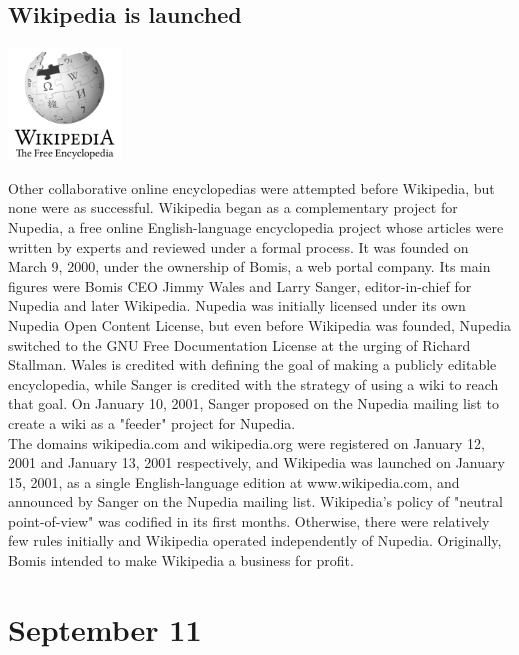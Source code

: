 \documentclass[11pt]{report}
\begin{document}
\subsection{Wikipedia is launched}
\vspace{2mm}\begin{center}\includegraphics[width=3cm]{./img/wikipedia.png}\end{center}
Other collaborative online encyclopedias were attempted before Wikipedia, but none were as successful. Wikipedia began as a complementary project for Nupedia, a free online English-language encyclopedia project whose articles were written by experts and reviewed under a formal process. It was founded on March 9, 2000, under the ownership of Bomis, a web portal company. Its main figures were Bomis CEO Jimmy Wales and Larry Sanger, editor-in-chief for Nupedia and later Wikipedia. Nupedia was initially licensed under its own Nupedia Open Content License, but even before Wikipedia was founded, Nupedia switched to the GNU Free Documentation License at the urging of Richard Stallman. Wales is credited with defining the goal of making a publicly editable encyclopedia, while Sanger is credited with the strategy of using a wiki to reach that goal. On January 10, 2001, Sanger proposed on the Nupedia mailing list to create a wiki as a "feeder" project for Nupedia.\\
The domains wikipedia.com and wikipedia.org were registered on January 12, 2001 and January 13, 2001 respectively, and Wikipedia was launched on January 15, 2001, as a single English-language edition at www.wikipedia.com, and announced by Sanger on the Nupedia mailing list. Wikipedia's policy of "neutral point-of-view" was codified in its first months. Otherwise, there were relatively few rules initially and Wikipedia operated independently of Nupedia. Originally, Bomis intended to make Wikipedia a business for profit.

\section{September 11}
\end{document}
